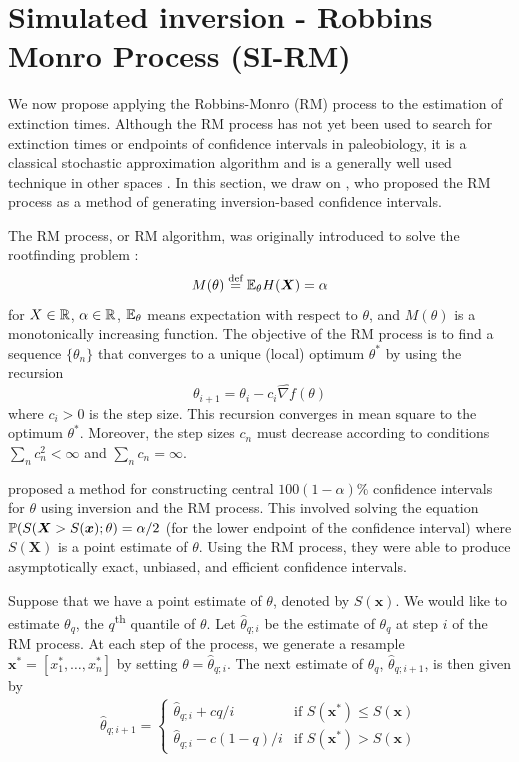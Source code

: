 \section{Simulated inversion - Robbins Monro Process (SI-RM)}

We now propose applying the Robbins-Monro (RM) process to the estimation of extinction times. Although the RM process has not yet been used to search for extinction times or endpoints of confidence intervals in paleobiology, it is a classical stochastic approximation algorithm and is a generally well used technique in other spaces \cite{Carpenter1999, Fisher2020}. In this section, we draw on \citet{Garthwaite1992}, who proposed the RM process as a method of generating inversion-based confidence intervals.

The RM process, or RM algorithm, was originally introduced to solve the rootfinding problem  \cite{Fu2015}: \[ M(\theta)\overset{\text{def}}{=} \mathbb{E}_\theta H(\bm{X}) = \alpha \] for $X \in \mathbb{R}$, $\alpha \in \mathbb{R}$, $\mathbb{E}_\theta$ means expectation with respect to $\theta$, and $M(\theta)$ is a monotonically increasing function. The objective of the RM process is to find a sequence $\{\theta_n\}$ that converges to a unique (local) optimum $\theta^*$ by using the recursion
\[ \theta_{i+1} = \theta_i - c_i \widehat{\nabla f}(\theta) \]
where $c_i > 0$ is the step size. This recursion converges in mean square to the optimum $\theta^*$. Moreover, the step sizes $c_n$ must decrease according to conditions $\sum_nc_n^2 < \infty$ and $\sum_n c_n = \infty$.

\citet{Garthwaite1992} proposed a method for constructing central $100(1-\alpha)\%$ confidence intervals for $\theta$ using inversion and the RM process. This involved solving the equation $\mathbb{P}(S(\bm{X} > S(\bm{x}); \theta) = \alpha/2$ (for the lower endpoint of the confidence interval) where $S(\bm{X})$ is a point estimate of $\theta$. Using the RM process, they were able to produce asymptotically exact, unbiased, and efficient confidence intervals.

Suppose that we have a point estimate of $\theta$, denoted by $S(\bm{x})$. We would like to estimate $\theta_{q}$, the $q$\textsuperscript{th} quantile of $\theta$. Let $\hat\theta_{q; i}$ be the estimate of $\theta_q$ at step $i$ of the RM process. At each step of the process, we generate a resample $\bm{x}^* = [x_1^*, \dots, x_n^*]$ by setting $\theta = \hat\theta_{q; i}$. The next estimate of $\theta_q$, $\hat\theta_{q; i+1}$, is then given by \begin{align}
    \hat\theta_{q; i+1} = \begin{cases}
        \hat\theta_{q; i} + c q/i &\text{if $S(\bm{x^*}) \leq S(\bm{x})$} \\
        \hat\theta_{q; i} - c (1-q)/i &\text{if $S(\bm{x^*}) > S(\bm{x})$}
    \end{cases}
\end{align}

